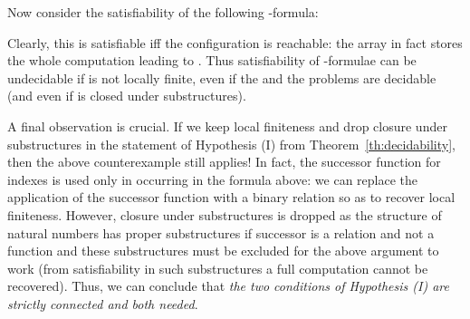 \documentclass{LMCS}
\theoremstyle{plain}\newtheorem{assumption}[thm]{Assumption}
\theoremstyle{plain}\newtheorem{proposition}[thm]{Proposition}
\theoremstyle{plain}\newtheorem{property}[thm]{Property}
\theoremstyle{plain}\newtheorem{example}[thm]{Example}
\theoremstyle{plain}\newtheorem{claim}[thm]{Claim}
\theoremstyle{plain}\newtheorem{lemma}[thm]{Lemma}
\begin{document}
Now consider the satisfiability of the following
-formula:

Clearly, this is satisfiable iff the configuration  is reachable: the array  in fact stores the whole
computation leading to . 
Thus satisfiability of -formulae can be
undecidable if  is not locally finite, even if the  and
the  problems are decidable (and even if  is closed
under substructures).

A final observation is crucial.  If we keep local finiteness and drop
closure under substructures in the statement of Hypothesis (I) from
Theorem~\ref{th:decidability}, then the above counterexample still
applies!  In fact, the successor function for indexes is used only in
 occurring in the formula above: we can replace the
application of the successor function with a binary relation  so as to recover local finiteness.  However, closure under
substructures is dropped as the structure of natural numbers
has proper substructures if successor is a relation and not a function
and these substructures must be excluded for the above argument to
work (from satisfiability in such substructures a full computation
cannot be recovered). Thus, we can conclude that \emph{the two
  conditions of Hypothesis (I) are strictly connected and both
  needed}.

 
\end{document}
